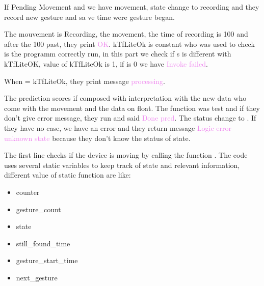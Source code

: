 If  Pending Movement and we have movement, state change to recording and they record new gesture and sa	ve time were gesture began. 


\begin{center}
    \label{Magic Wand function}
\end{center}


The mouvement is Recording, the movement, the time of recording is 100 and after the 100 past, they print \textcolor{violet}{OK}. 
kTfLiteOk is constant who was used to check is the programm correctly run, in this part we check if s is different with kTfLiteOK, value of kTfLiteOk is 1, if  is 0 we have \textcolor{violet}{Invoke failed}.

When = kTfLiteOk, they print message \textcolor{violet}{processing}.

\begin{center}
    \label{Magic Wand function}
\end{center}

The prediction scores if composed with interpretation with the new data who come with the movement and the data on float. The function  was test and if they don't give error message, they run and said  \textcolor{violet}{Done pred}. The status change to . If they have no case, we have an error and they return message \textcolor{violet}{Logic error unknown state} because they don't know the status of state. 

\begin{center}
    \label{Magic Wand function}
\end{center}

The first line checks if the device is moving by calling the function .
The code uses several static variables to keep track of state and relevant information, different value of static function are like: 
\begin{itemize}
    \item counter
    \item gesture\_count
    \item state
    \item still\_found\_time
    \item gesture\_start\_time
    \item next\_gesture
\end{itemize}

